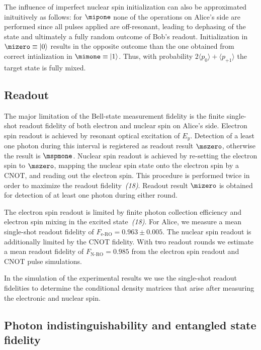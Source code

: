 The influence of imperfect nuclear spin initialization can also be approximated inituitively as follows: for $\mipone$ none of the operations on Alice's side are performed since all pulses applied are off-resonant, leading to dephasing of the state and ultimately a fully random outcome of Bob's readout. Initialization in $\mizero \equiv \ket0$ results in the opposite outcome than the one obtained from correct intialization in $\mimone \equiv \ket1$. Thus, with probability $2 \langle p_{0} \rangle + \langle p_{+1} \rangle$ the target state is fully mixed.

\subsection{Readout}
\label{sec:readout-error}

The major limitation of the Bell-state measurement fidelity is the finite single-shot readout fidelity of both electron and nuclear spin on Alice's side. Electron spin readout is achieved by resonant optical excitation of $E_y$. Detection of a least one photon during this interval is registered as readout result $\mszero$, otherwise the result is $\mspmone$. Nuclear spin readout is achieved by re-setting the electron spin to $\mszero$, mapping the nuclear spin state onto the electron spin by a CNOT, and reading out the electron spin. This procedure is performed twice in order to maximize the readout fidelity~{\em (18)}. %
Readout result $\mizero$ is obtained for detection of at least one photon during either round.

The electron spin readout is limited by finite photon collection efficiency and electron spin mixing in the excited state~{\em (18)}. %
For Alice, we measure a mean single-shot readout fidelity of $F_\text{e-RO} = 0.963 \pm 0.005$. The nuclear spin readout is additionally limited by the CNOT fidelity. With two readout rounds we estimate a mean readout fidelity of $F_\text{N-RO} = 0.985$ from the electron spin readout and CNOT pulse simulations.

In the simulation of the experimental results we use the single-shot readout fidelities to determine the conditional density matrices that arise after measuring the electronic and nuclear spin.

\subsection{Photon indistinguishability and entangled state fidelity}
\label{sec:lde-visibility}

